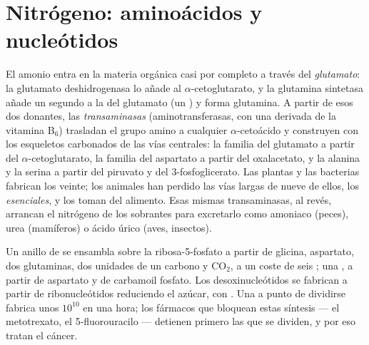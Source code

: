 \section{Nitrógeno: aminoácidos y nucleótidos}

\begin{definition}\label{def:b1:biosyntheses-integration:nitrogen}
El amonio entra en la materia orgánica casi por completo a través del
\emph{glutamato}: la glutamato deshidrogenasa lo añade al
$\alpha$-cetoglutarato, y la glutamina sintetasa añade un segundo a la
 del glutamato (un ) y forma glutamina. A partir de esos
dos donantes, las \emph{transaminasas} (aminotransferasas, con una 
derivada de la vitamina B$_6$) trasladan el grupo amino a cualquier
$\alpha$-cetoácido y construyen  con los esqueletos carbonados de
las vías centrales: la familia del glutamato a partir del
$\alpha$-cetoglutarato, la familia del aspartato a partir del oxalacetato, y
la alanina y la serina a partir del piruvato y del 3-fosfoglicerato. Las
plantas y las bacterias fabrican los veinte; los animales han perdido las
vías largas de nueve de ellos, los  \emph{esenciales}, y los
toman del alimento. Esas mismas transaminasas, al revés, arrancan el
nitrógeno de los  sobrantes para excretarlo como amoniaco (peces),
urea (mamíferos) o ácido úrico (aves, insectos).
\end{definition}

\begin{example}[Nucleótidos]\label{ex:b1:biosyntheses-integration:nucleotides}
Un anillo de  se ensambla sobre la ribosa-5-fosfato a partir de
glicina, aspartato, dos glutaminas, dos unidades de un carbono y
$\mathrm{CO_2}$, a un coste de seis ; una , a partir de
aspartato y de carbamoil fosfato. Los desoxinucleótidos se fabrican a partir
de ribonucleótidos reduciendo el azúcar, con . Una  a punto de
dividirse fabrica unos $10^{10}$  en una hora; los fármacos que
bloquean estas síntesis --- el metotrexato, el 5-fluorouracilo --- detienen
primero las  que se dividen, y por eso tratan el cáncer.
\end{example}

